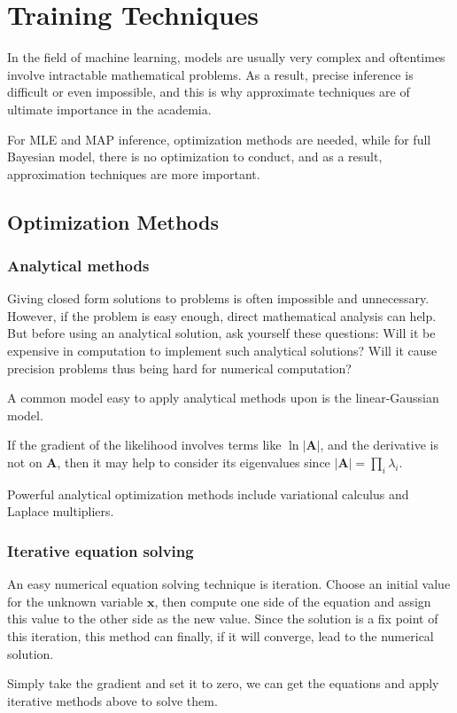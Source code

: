 \documentclass[a4paper]{book}
\renewcommand{\bf}{\mathbf}
\begin{document}
\chapter{Training Techniques}
In the field of machine learning, models are usually very complex and oftentimes involve intractable mathematical problems. As a result, precise inference is difficult or even impossible, and this is why approximate techniques are of ultimate importance in the academia. 

For MLE and MAP inference, optimization methods are needed, while for full Bayesian model, there is no optimization to conduct, and as a result, approximation techniques are more important.
\section{Optimization Methods}
\subsection{Analytical methods} \label{eigen}
Giving closed form solutions to problems is often impossible and unnecessary. However, if the problem is easy enough, direct mathematical analysis can help. But before using an analytical solution, ask yourself these questions: Will it be expensive in computation to implement such analytical solutions? Will it cause precision problems thus being hard for numerical computation?

A common model easy to apply analytical methods upon is the linear-Gaussian model. 

If the gradient of the likelihood involves terms like $\ln|\bf{A}|$, and the derivative is not on $\bf{A}$, then it may help to consider its eigenvalues since $|\bf{A}| = \prod_i \lambda_i$.

Powerful analytical optimization methods include variational calculus and Laplace multipliers.
\subsection{Iterative equation solving}
An easy numerical equation solving technique is iteration. Choose an initial value for the unknown variable $\bf{x}$, then compute one side of the equation and assign this value to the other side as the new value. Since the solution is a fix point of this iteration, this method can finally, if it will converge, lead to the numerical solution.

Simply take the gradient and set it to zero, we can get the equations and apply iterative methods above to solve them.
\end{document}
